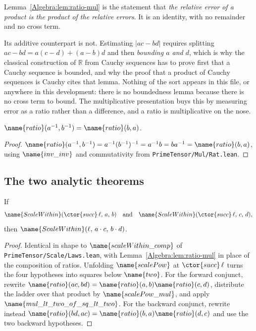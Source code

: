 \begin{designnote}
\label{Algebra:note:exact-product}
Lemma~\ref{Algebra:lem:ratio-mul} is the statement that \emph{the relative
error of a product is the product of the relative errors}.  It is an identity,
with no remainder and no cross term.

Its additive counterpart is not.  Estimating
$\lvert ac - bd\rvert$ requires splitting
$ac - bd = a(c-d) + (a-b)d$ and then \emph{bounding $a$ and $d$}, which is why
the classical construction of $\mathbb{R}$ from Cauchy sequences has to prove
first that a Cauchy sequence is bounded, and why the proof that a product of
Cauchy sequences is Cauchy cites that lemma.  Nothing of the sort appears in
this file, or anywhere in this development: there is no boundedness lemma
because there is no cross term to bound.  The multiplicative presentation buys
this by measuring error as a ratio rather than a difference, and a ratio is
multiplicative on the nose.
\end{designnote}

\begin{lemma}\label{Algebra:lem:ratio-inv}
$\name{ratio}(a^{-1}, b^{-1}) = \name{ratio}(b, a)$.
\end{lemma}

\begin{proof}
$\name{ratio}(a^{-1},b^{-1}) = a^{-1}(b^{-1})^{-1} = a^{-1}b = ba^{-1} =
\name{ratio}(b,a)$, using $\name{inv\_inv}$ and commutativity from
\texttt{PrimeTensor/Mul/Rat.lean}.
\end{proof}

\subsection{The two analytic theorems}

\begin{theorem}\label{Algebra:thm:scalewithin-mul}
If
\[
  \name{ScaleWithin}(\ctor{succ}\,\ell,\, a,\, b)
  \quad\text{and}\quad
  \name{ScaleWithin}(\ctor{succ}\,\ell,\, c,\, d),
\]
then $\name{ScaleWithin}(\ell,\, a \cdot c,\, b \cdot d)$.
\end{theorem}

\begin{proof}
Identical in shape to $\name{scaleWithin\_comp}$ of
\texttt{PrimeTensor/Scale/Laws.lean}, with
Lemma~\ref{Algebra:lem:ratio-mul} in place of the composition of ratios.
Unfolding $\name{scalePow}$ at $\ctor{succ}\,\ell$ turns the four hypotheses
into squares below $\name{two}$.  For the forward conjunct, rewrite
$\name{ratio}(ac,bd) = \name{ratio}(a,b)\name{ratio}(c,d)$, distribute the
ladder over that product by $\name{scalePow\_mul}$, and apply
$\name{mul\_lt\_two\_of\_sq\_lt\_two}$.  For the backward conjunct, rewrite
instead $\name{ratio}(bd,ac) = \name{ratio}(b,a)\name{ratio}(d,c)$ and use the
two backward hypotheses.
\end{proof}

